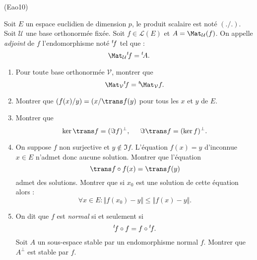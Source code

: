 \begin{tiny}(Eao10)\end{tiny} Soit $E$ un espace euclidien de dimension $p$, le produit scalaire est noté $(./.)$. Soit $\mathcal U$ une base orthonormée fixée. Soit $f\in \mathcal L(E)$ et $A = \Mat_{\mathcal{U}}(f)$. On appelle \emph{adjoint} de $f$ l'endomorphisme noté $\mathstrut^t\!f$ tel que :
\begin{displaymath}
 \Mat_{\mathcal U}\mathstrut^t\!f = \mathstrut^t\!A.
\end{displaymath}
\begin{enumerate}
 \item Pour toute base orthonormée $\mathcal V$, montrer que
\begin{displaymath}
 \Mat_{\mathcal V}\mathstrut^t\!f = \mathstrut^t\!\Mat_{\mathcal V}f.
\end{displaymath}
\item Montrer que $(f(x)/y)=(x/\trans f(y)$ pour tous les $x$ et $y$ de $E$.
\item Montrer que 
\begin{displaymath}
 \ker \trans f= (\Im f)^\bot , \hspace{0.5cm} \Im \trans f = (\ker f)^\bot.
\end{displaymath}
\item On suppose $f$ non surjective et $y \notin \Im f$. L'équation $f(x)=y$ d'inconnue $x\in E$
 n'admet donc aucune solution. Montrer que l'équation
\begin{displaymath}
 \trans f \circ f(x)= \trans f (y)
\end{displaymath}
admet des solutions. Montrer que si $x_0$ est une solution de cette équation alors :
\begin{displaymath}
 \forall x\in E : \Vert f(x_0)-y\Vert  \leq  \Vert f(x)-y\Vert.
\end{displaymath}
\item On dit que $f$ est \emph{normal} si et seulement si 
\begin{displaymath}
  \mathstrut^t\!f \circ f  = f \circ \mathstrut^t\!f .
\end{displaymath}
Soit $A$ un sous-espace stable par un endomorphisme normal $f$. Montrer que $A^{\bot}$ est stable par $f$. 
\end{enumerate}
